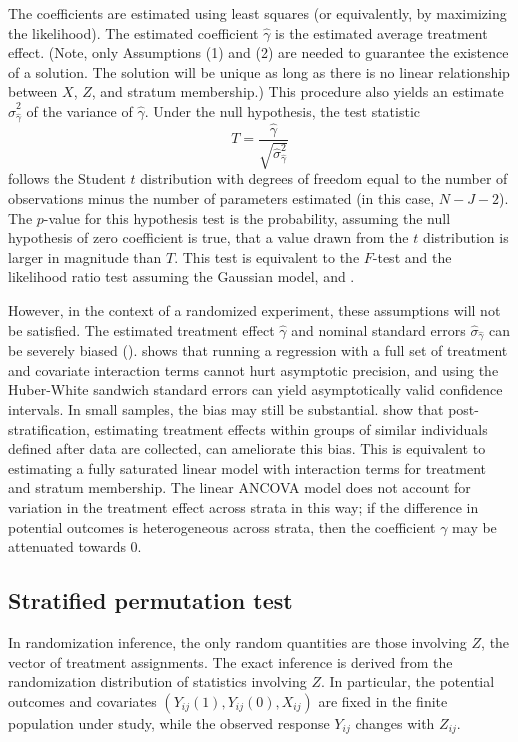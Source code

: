 \documentclass[12pt]{article}
\newcommand{\todo}[1]{{\color{red}{TO DO: \sc #1}}}
\begin{document}
\todo{are the estimator, standard error, variance clear here?}
The coefficients are estimated using least squares (or equivalently, by maximizing the likelihood).
The estimated coefficient $\hat{\gamma}$ is the estimated average treatment effect. 
(Note, only Assumptions (1) and (2) are needed to guarantee the existence of a solution.
The solution will be unique as long as there is no linear relationship between $X$, $Z$, and stratum membership.)
This procedure also yields an estimate $\hat{\sigma}_{\hat{\gamma}}^2$ of the variance of $\hat{\gamma}$.
Under the null hypothesis, the test statistic 
$$ T = \frac{\hat{\gamma}}{\sqrt{ \hat{\sigma}_{\hat{\gamma}}^2}}$$
follows the Student $t$ distribution with degrees of freedom equal to the number of observations minus the number of parameters estimated (in this case, $N - J - 2$).
The $p$-value for this hypothesis test is the probability, assuming the null hypothesis of zero coefficient is true, that a value drawn from the $t$ distribution is larger in magnitude than $T$.
This test is equivalent to the $F$-test and the likelihood ratio test assuming the Gaussian model,
and \todo{ cite this? is therefore locally most powerful ????}.

However, in the context of a randomized experiment, these assumptions will not be satisfied.
The estimated treatment effect $\hat{\gamma}$ and nominal standard errors $\hat{\sigma}_{\hat{\gamma}}$ can be severely biased (\todo{cite freedman 2008, lin 2013}).
\todo{Lin 2013} shows that running a regression with a full set of treatment and covariate interaction terms cannot hurt asymptotic precision, and using the Huber-White sandwich standard errors can yield asymptotically valid confidence intervals.
In small samples, the bias may still be substantial.
\todo{cite Sekhon post-stratification} show that post-stratification, estimating treatment effects within groups of similar individuals defined after data are collected, can ameliorate this bias.
This is equivalent to estimating a fully saturated linear model with interaction terms for treatment and stratum membership.
The linear ANCOVA model does not account for variation in the treatment effect across strata in this way;
if the difference in potential outcomes is heterogeneous across strata, then the coefficient $\gamma$ may be attenuated towards 0.


\subsection{Stratified permutation test}\label{subsec:strat_perm_test}
In randomization inference, the only random quantities are those involving $Z$, the vector of treatment assignments.
The exact inference is derived from the randomization distribution of statistics involving $Z$.
In particular, the potential outcomes and covariates $(Y_{ij}(1), Y_{ij}(0), X_{ij})$ are fixed in the finite population under study, while the observed response $Y_{ij}$ changes with $Z_{ij}$.
\todo{cite rosenberg 2002}
\end{document}
